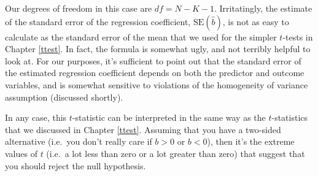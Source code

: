 \documentclass[
]{book}
\theoremstyle{definition}
\theoremstyle{definition}
\theoremstyle{definition}
\theoremstyle{definition}
\theoremstyle{remark}
\begin{document}
Our degrees of freedom in this case are \(df = N- K- 1\). Irritatingly, the estimate of the standard error of the regression coefficient, \(\mbox{SE}({\hat{b}})\), is not as easy to calculate as the standard error of the mean that we used for the simpler \(t\)-tests in Chapter \ref{ttest}. In fact, the formula is somewhat ugly, and not terribly helpful to look at. For our purposes, it's sufficient to point out that the standard error of the estimated regression coefficient depends on both the predictor and outcome variables, and is somewhat sensitive to violations of the homogeneity of variance assumption (discussed shortly).

In any case, this \(t\)-statistic can be interpreted in the same way as the \(t\)-statistics that we discussed in Chapter \ref{ttest}. Assuming that you have a two-sided alternative (i.e.~you don't really care if \(b >0\) or \(b < 0\)), then it's the extreme values of \(t\) (i.e.~a lot less than zero or a lot greater than zero) that suggest that you should reject the null hypothesis.
\end{document}

